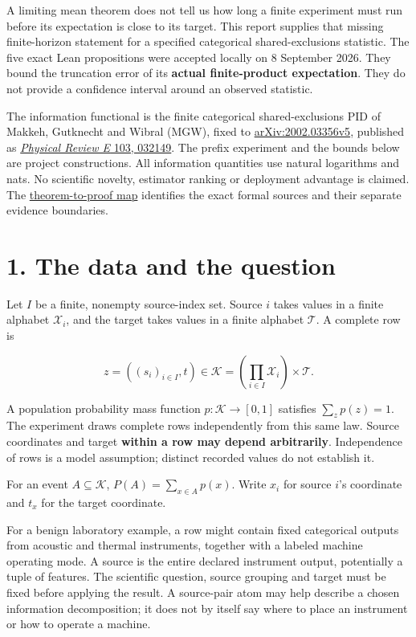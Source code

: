 \documentclass[11pt,a4paper]{article}
\title{\PidReportTitle{Finite-horizon bias bounds for categorical shared-exclusions atoms}{Exact truncation error, population support and limits of use}}
\author{Sepehr Mahmoudian}
\date{8 September 2026}
\newcounter{none}
\begin{document}
\PidMakeTitle
A limiting mean theorem does not tell us how long a finite experiment must run before its expectation is close to its target. This report supplies that missing finite-horizon statement for a specified categorical shared-exclusions statistic. The five exact Lean propositions were accepted locally on 8 September 2026. They bound the truncation error of its \textbf{actual finite-product expectation}. They do not provide a confidence interval around an observed statistic.

The information functional is the finite categorical shared-exclusions PID of Makkeh, Gutknecht and Wibral (MGW), fixed to \href{https://arxiv.org/abs/2002.03356v5}{arXiv:2002.03356v5}, published as \href{https://doi.org/10.1103/PhysRevE.103.032149}{\emph{Physical Review E} 103, 032149}. The prefix experiment and the bounds below are project constructions. All information quantities use natural logarithms and nats. No scientific novelty, estimator ranking or deployment advantage is claimed. The \href{https://github.com/sepahead/pid-rs/blob/main/audit/formal/lean-prefix-mgw-bias/THEOREM_MAP.md}{theorem-to-proof map} identifies the exact formal sources and their separate evidence boundaries.

\section{1. The data and the question}\label{the-data-and-the-question}

Let \(I\) be a finite, nonempty source-index set. Source \(i\) takes values in a finite alphabet \(\mathcal X_i\), and the target takes values in a finite alphabet \(\mathcal T\). A complete row is

\[
z=((s_i)_{i\in I},t)\in\mathcal K
  =\left(\prod_{i\in I}\mathcal X_i\right)\times\mathcal T.
\]

A population probability mass function \(p:\mathcal K\to[0,1]\) satisfies \(\sum_z p(z)=1\). The experiment draws complete rows independently from this same law. Source coordinates and target \textbf{within a row may depend arbitrarily}. Independence of rows is a model assumption; distinct recorded values do not establish it.

For an event \(A\subseteq\mathcal K\), \(P(A)=\sum_{x\in A}p(x)\). Write \(x_i\) for source \(i\)'s coordinate and \(t_x\) for the target coordinate.

For a benign laboratory example, a row might contain fixed categorical outputs from acoustic and thermal instruments, together with a labeled machine operating mode. A source is the entire declared instrument output, potentially a tuple of features. The scientific question, source grouping and target must be fixed before applying the result. A source-pair atom may help describe a chosen information decomposition; it does not by itself say where to place an instrument or how to operate a machine.
\end{document}
